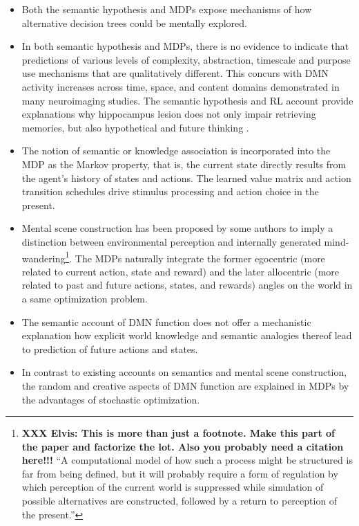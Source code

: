 \documentclass[10pt,letterpaper]{article}
\begin{document}
\begin{itemize}
  \item Both the semantic hypothesis and MDPs expose mechanisms of
  how alternative decision trees could be mentally explored.
  \item In both semantic hypothesis and MDPs,
  there is no evidence to indicate that predictions of various
  levels of complexity, abstraction, timescale and purpose
  use mechanisms that are qualitatively different. This concurs with
  DMN activity increases across time, space, and content domains
  demonstrated in many neuroimaging studies. The semantic hypothesis
  and RL account provide explanations why hippocampus lesion does
  not only impair retrieving memories, but also hypothetical and future
  thinking \citep{hassabis2007patients}.
  \item The notion of semantic or knowledge association is
  incorporated into the MDP as the Markov property,
  that is, the current state directly results from the
  agent's history of states and actions. The learned
  value matrix and action transition schedules drive
  stimulus processing and action choice in the present.
  \item Mental scene construction has been proposed by some authors
  \citep{buckner2007self} to imply a distinction between
    environmental perception and internally generated mind-wandering\footnote{
      \textbf{XXX Elvis: This is more than just a footnote. Make this part of the paper
      and factorize the lot. Also you probably need a citation here!!!}
  ``A computational model of how such a process might be structured
  is far from being defined, but it will probably require a form of
  regulation by which perception of the current world is suppressed
  while simulation of possible alternatives are constructed,
  followed by a return to perception of the present.''\citep{buckner2007self}}.
  The MDPs naturally integrate the former egocentric
  (more related to current action, state and reward) and the later
  allocentric (more related to past and future actions, states, and rewards)
  angles on the world in a same optimization problem.
  \item The semantic account of DMN function does not offer
  a mechanistic explanation how explicit world knowledge and semantic analogies thereof
  lead to prediction of future actions and states.
  \item In contrast to existing accounts on semantics and
  mental scene construction, the random and creative aspects of DMN function
  are explained in MDPs by the advantages of stochastic optimization.

\end{itemize}
\end{document}
